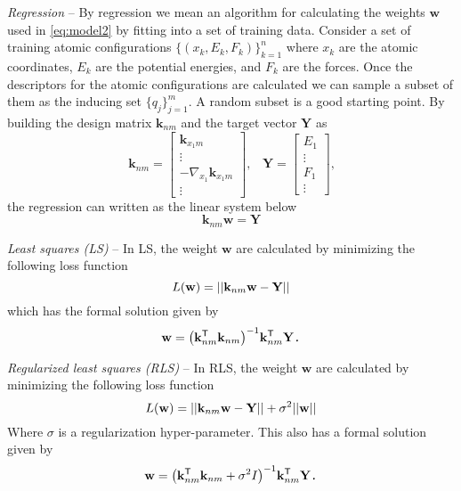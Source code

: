 \documentclass[12pt]{article}
\DeclarePairedDelimiter\paren{(}{)}
\DeclarePairedDelimiter\norm{||}{||}
\newcommand{\indu}{q}
\newcommand{\gradients}{{\nabla}}
\begin{document}
\emph{Regression} --
By regression we mean an algorithm for calculating
the weights $\mathbf{w}$ used in \autoref{eq:model2}
by fitting into a set of training data.
Consider a set of training atomic configurations
$\{(x_k, E_k, F_k)\}_{k=1}^n$
where $x_k$ are the atomic coordinates, $E_k$ are the
potential energies, and $F_k$ are the forces.
Once the descriptors for the atomic configurations
are calculated we can sample a subset of them as the
inducing set $\{\indu_j\}_{j=1}^m$.
A random subset is a good starting point.
By building the design matrix $\mathbf{k}_{nm}$ and
the target vector $\mathbf{Y}$ as
\begin{equation}
    \mathbf{k}_{nm} =
        \begin{bmatrix}
            \mathbf{k}_{x_1 m} \\
            \vdots \\
            - \gradients_{x_1} \mathbf{k}_{x_1 m} \\
            \vdots
        \end{bmatrix}
    \texttt{,} \quad
    \mathbf{Y} =
        \begin{bmatrix}
            E_1 \\
            \vdots \\
            F_1 \\
            \vdots
        \end{bmatrix}
    \texttt{,}
\end{equation}
the regression can written as the linear system below
\begin{equation}
    \mathbf{k}_{nm} \mathbf{w} = \mathbf{Y}
\end{equation}

\emph{Least squares (LS)} --
In LS, the weight $\mathbf{w}$ are calculated by minimizing
the following loss function
\begin{equation}
    L(\mathbf{w}) =
        \norm*{\mathbf{k}_{nm} \mathbf{w} - \mathbf{Y}}
\end{equation}
which has the formal solution given by
\begin{equation}
    \mathbf{w} =
        \paren*{\mathbf{k}_{nm}^\mathsf{T} \mathbf{k}_{nm}}^{-1}
        \mathbf{k}_{nm}^\mathsf{T} \mathbf{Y}
    \texttt{.}
\end{equation}

\emph{Regularized least squares (RLS)} --
In RLS, the weight $\mathbf{w}$ are calculated by minimizing
the following loss function
\begin{equation}
    L(\mathbf{w}) =
        \norm*{\mathbf{k}_{nm} \mathbf{w} - \mathbf{Y}}
        + \sigma^2 \norm{\mathbf{w}}
\end{equation}
Where $\sigma$ is a regularization hyper-parameter.
This also has a formal solution given by
\begin{equation}
    \mathbf{w} =
        \paren*{\mathbf{k}_{nm}^\mathsf{T} \mathbf{k}_{nm} + \sigma^2 I}^{-1}
        \mathbf{k}_{nm}^\mathsf{T} \mathbf{Y}
    \texttt{.}
\end{equation}
\end{document}

